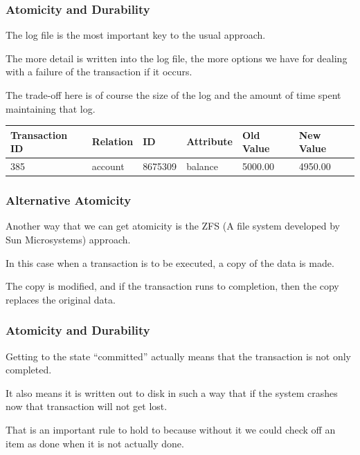 \begin{frame}
\frametitle{Atomicity and Durability}

The log file is the most important key to the usual approach. 

The more detail is written into the log file, the more options we have for dealing with a failure of the transaction if it occurs. 

The trade-off here is of course the size of the log and the amount of time spent maintaining that log. 


\begin{center}
\begin{tabular}{|l|l|l|l|l|l|}\hline
	\textbf{Transaction ID} & \textbf{Relation} & \textbf{ID} & \textbf{Attribute} & \textbf{Old Value} & \textbf{New Value}\\ \hline
	385 & account & 8675309 & balance & 5000.00 & 4950.00 \\ \hline
\end{tabular}
\end{center}



\end{frame}

\begin{frame}
\frametitle{Alternative Atomicity}

Another way that we can get atomicity is the ZFS (A file system developed by Sun Microsystems) approach. 

In this case when a transaction is to be executed, a copy of the data is made. 

The copy is modified, and if the transaction runs to completion, then the copy replaces the original data. 


\end{frame}

\begin{frame}
\frametitle{Atomicity and Durability}

Getting to the state ``committed'' actually means that the transaction is not only completed. 

It also means it is written out to disk in such a way that if the system crashes now that transaction will not get lost. 

That is an important rule to hold to because without it we could check off an item as done when it is not actually done.

\end{frame}

